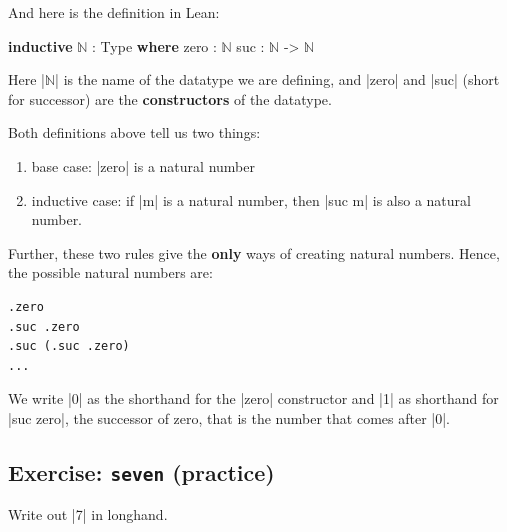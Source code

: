 \documentclass{memoir}
\newcommand{\PLFANat}{\ensuremath{\mathbb{N}}}
\begin{document}
\par
And here is the definition in Lean:

\par
\begin{LeanVerbatim}
\textbf{inductive} \PLFANat{} : Type \textbf{where}
     zero : \PLFANat{}
     suc  : \PLFANat{} -> \PLFANat{}
\end{LeanVerbatim}

\par
Here \LeanVerb|\PLFANat{}| is the name of the datatype we are defining, and \LeanVerb|zero| and \LeanVerb|suc|
(short for successor) are the \textbf{constructors} of the datatype.

\par
Both definitions above tell us two things:

\begin{enumerate}
\item base case: \LeanVerb|zero| is a natural number
\item inductive case: if \LeanVerb|m| is a natural number, then \LeanVerb|suc m| is also a natural
number.

\end{enumerate}

\par
Further, these two rules give the \textbf{only} ways of creating natural numbers.
Hence, the possible natural numbers are:

\par
\begin{verbatim}
.zero
.suc .zero
.suc (.suc .zero)
...
\end{verbatim}

\par
We write \LeanVerb|0| as the shorthand for the \LeanVerb|zero| constructor and \LeanVerb|1| as shorthand
for \LeanVerb|suc zero|, the successor of zero, that is the number that comes after \LeanVerb|0|.

\par

\subsection{Exercise: \texttt{seven} (practice)}\label{PLFA--in--Lean----Part--1----Naturals----Exercise-005F-005F-005F----seven-----005FLPAR-005Fpractice-005FRPAR-005F}

\par
Write out \LeanVerb|7| in longhand.
\end{document}
